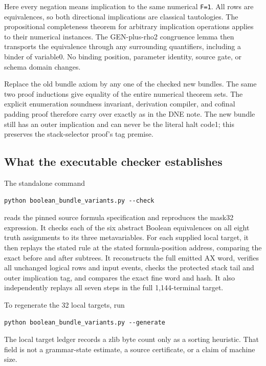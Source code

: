 Here every negation means implication to the same numerical
\texttt{F=1}. All rows are equivalences, so both directional
implications are classical tautologies. The propositional completeness
theorem for arbitrary implication operations applies to their numerical
instances. The GEN-plus-rho2 congruence lemma then transports the
equivalence through any surrounding quantifiers, including a binder of
variable0. No binding position, parameter identity, source gate, or
schema domain changes.

Replace the old bundle axiom by any one of the checked new bundles. The
same two proof inductions give equality of the entire numerical theorem
sets. The explicit enumeration soundness invariant, derivation compiler,
and cofinal padding proof therefore carry over exactly as in the DNE
note. The new bundle still has an outer implication and can never be the
literal halt code1; this preserves the stack-selector proof's tag
premise.

\hypertarget{what-the-executable-checker-establishes}{%
\subsection{What the executable checker
establishes}\label{what-the-executable-checker-establishes}}

The standalone command

\begin{verbatim}
python boolean_bundle_variants.py --check
\end{verbatim}

reads the pinned source formula specification and reproduces the mask32
expression. It checks each of the six abstract Boolean equivalences on
all eight truth assignments to its three metavariables. For each
supplied local target, it then replays the stated rule at the stated
formula-position address, comparing the exact before and after subtrees.
It reconstructs the full emitted AX word, verifies all unchanged logical
rows and input events, checks the protected stack tail and outer
implication tag, and compares the exact fine word and hash. It also
independently replays all seven steps in the full 1,144-terminal target.

To regenerate the 32 local targets, run

\begin{verbatim}
python boolean_bundle_variants.py --generate
\end{verbatim}

The local target ledger records a zlib byte count only as a sorting
heuristic. That field is not a grammar-state estimate, a source
certificate, or a claim of machine size.

